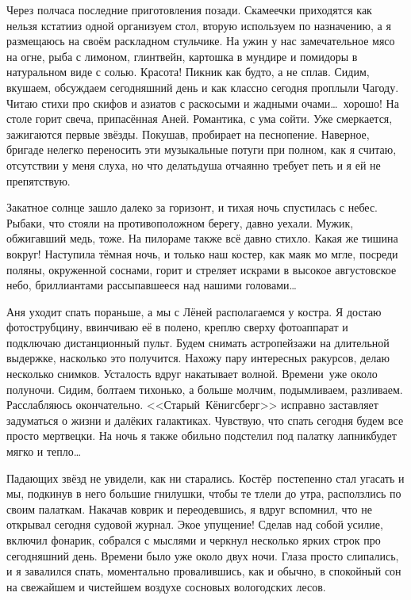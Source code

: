 Через полчаса последние приготовления позади. Скамеечки приходятся как нельзя кстати\mdash из одной организуем стол, вторую используем по назначению, а я размещаюсь на своём раскладном стульчике. На ужин у нас замечательное мясо на огне, рыба с лимоном, глинтвейн, картошка в мундире и помидоры в натуральном виде с солью. Красота! Пикник как будто, а не сплав. Сидим, вкушаем, обсуждаем сегодняшний день и как классно сегодня проплыли Чагоду. Читаю стихи про скифов и азиатов с раскосыми и жадными очами\ldots~хорошо! На столе горит свеча, припасённая Аней. Романтика, с ума сойти. Уже смеркается, зажигаются первые звёзды. Покушав, пробирает на песнопение. Наверное, бригаде нелегко переносить эти музыкальные потуги при полном, как я считаю, отсутствии у меня слуха, но что делать\mdash душа отчаянно требует петь и я ей не препятствую. 

Закатное солнце зашло далеко за горизонт, и тихая ночь спустилась с небес. Рыбаки, что стояли на противоположном берегу, давно уехали. Мужик, обжигавший медь, тоже. На пилораме также всё давно стихло. Какая же тишина вокруг! Наступила тёмная ночь, и только наш костер, как маяк мо мгле, посреди поляны, окруженной соснами, горит и стреляет искрами в высокое августовское небо, бриллиантами рассыпавшееся над нашими головами\ldots~

Аня уходит спать пораньше, а мы с Лёней располагаемся у костра. Я достаю фотострубцину, ввинчиваю её в полено, креплю сверху фотоаппарат и подключаю дистанционный пульт. Будем снимать астропейзажи на длительной выдержке, насколько это получится. Нахожу пару интересных ракурсов, делаю несколько снимков. Усталость вдруг накатывает волной. Времени~уже около полуночи. Сидим, болтаем тихонько, а больше молчим, подымливаем, разливаем. Расслабляюсь окончательно. <<Старый~Кёнигсберг>> исправно заставляет задуматься о жизни и далёких галактиках. Чувствую, что спать сегодня будем все просто мертвецки. На ночь я также обильно подстелил под палатку лапник\mdash будет мягко и тепло\ldots~
  
Падающих звёзд не увидели, как ни старались. Костёр~постепенно стал угасать и мы, подкинув в него большие гнилушки, чтобы те тлели до утра, расползлись по своим палаткам. Накачав коврик и переодевшись, я вдруг вспомнил, что не открывал сегодня судовой журнал. Экое упущение! Сделав над собой усилие, включил фонарик, собрался с мыслями и черкнул несколько ярких строк про сегодняшний день. Времени было уже около двух ночи. Глаза просто слипались, и я завалился спать, моментально провалившись, как и обычно, в спокойный сон на свежайшем и чистейшем воздухе сосновых вологодских лесов.

\begin{center}
\end{center}